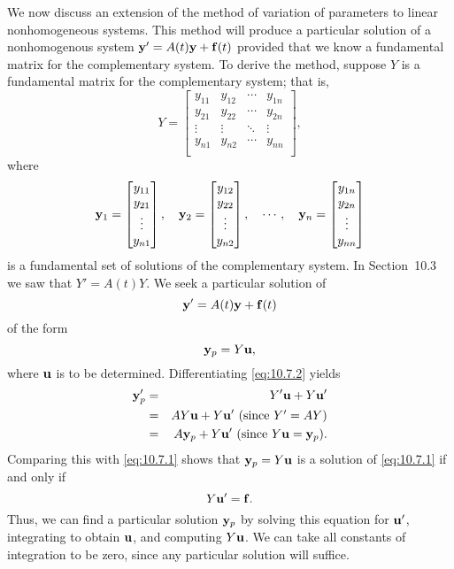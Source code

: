 \documentclass{ximera}
\begin{document}
We now discuss an extension of the method of variation of parameters
to linear nonhomogeneous systems. This method will produce a
particular solution of a nonhomogenous system ${\bf y}'=A(t){\bf y}+{\bf f}(t)$ provided that we know a fundamental matrix for the
complementary system. To derive the method, suppose $Y$ is a
fundamental matrix for the complementary system; that is,
$$
Y=\begin{bmatrix}
y_{11}&y_{12}&\cdots&y_{1n} \\
y_{21}&y_{22}&\cdots&y_{2n}\\
\vdots&\vdots&\ddots&\vdots \\
y_{n1}&y_{n2}&\cdots&y_{nn} \\
\end{bmatrix},
$$
where
$$
{\bf y}_1=\begin{bmatrix}y_{11}\\y_{21}\\ \vdots\\
y_{n1}\end{bmatrix},\quad
{\bf y}_2=\begin{bmatrix}y_{12}\\y_{22}\\ \vdots\\
y_{n2}\end{bmatrix},\quad \cdots,\quad
{\bf y}_n=\begin{bmatrix}y_{1n}\\y_{2n}\\ \vdots\\
y_{nn}\end{bmatrix}
$$
is a fundamental set of solutions of the complementary system.
In Section~10.3 we saw that $Y'=A(t)Y$. We seek a
particular solution of
\begin{equation} \label{eq:10.7.1}
{\bf y}'=A(t){\bf y}+{\bf f}(t)
\end{equation}
 of the form
\begin{equation} \label{eq:10.7.2}
{\bf y}_p=Y{\bf u},
\end{equation}
 where ${\bf u}$ is to be determined. Differentiating \eqref{eq:10.7.2} yields
\begin{eqnarray*}
 {\bf y}_p'&=&Y' {\bf u}+Y {\bf u}'
\\&=&A Y {\bf u}+Y {\bf u}'\mbox{ (since $Y'=AY$)}\\&=&
 A{\bf y}_p+Y {\bf u}'\mbox{ (since $Y{\bf u}={\bf y}_p$)}.
\end{eqnarray*}
Comparing this with  \eqref{eq:10.7.1} shows that ${\bf y}_p=Y{\bf u}$ is a
solution of \eqref{eq:10.7.1} if and only if
$$
Y{\bf u}'={\bf f}.
$$
Thus, we can find a particular solution ${\bf y}_p$ by solving this
equation for ${\bf u}'$, integrating to obtain ${\bf u}$, and
computing $Y{\bf u}$. We can take all constants of integration to be
zero, since any particular solution will suffice.
\end{document}
